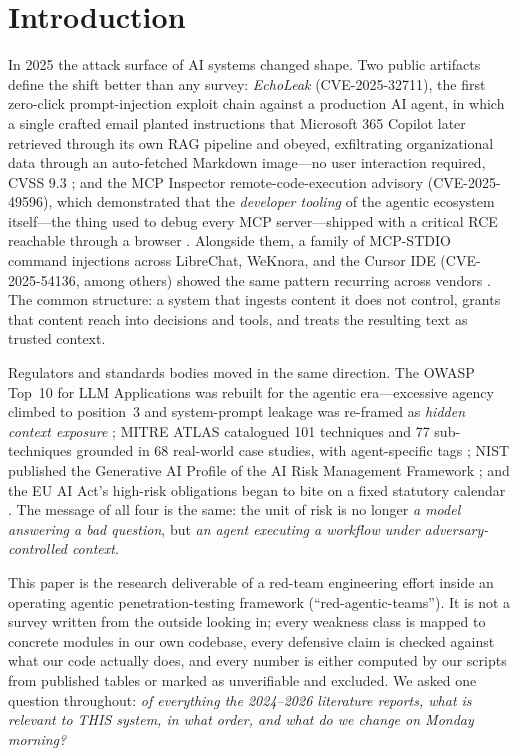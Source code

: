 \section{Introduction}\label{sec:intro}

In 2025 the attack surface of AI systems changed shape. Two public artifacts define
the shift better than any survey: \emph{EchoLeak} (CVE-2025-32711), the first
zero-click prompt-injection exploit chain against a production AI agent, in which a
single crafted email planted instructions that Microsoft 365 Copilot later retrieved
through its own RAG pipeline and obeyed, exfiltrating organizational data through an
auto-fetched Markdown image---no user interaction required, CVSS 9.3
\cite{echolake-cve,echolake-paper}; and the MCP Inspector remote-code-execution
advisory (CVE-2025-49596), which demonstrated that the \emph{developer tooling} of
the agentic ecosystem itself---the thing used to debug every MCP server---shipped
with a critical RCE reachable through a browser
\cite{cve-2025-49596,oligo-mcp}. Alongside them, a family of MCP-STDIO command
injections across LibreChat, WeKnora, and the Cursor IDE
(CVE-2025-54136, among others) showed the same pattern recurring across vendors
\cite{ox-mcp-family}. The common structure: a system that ingests content it does
not control, grants that content reach into decisions and tools, and treats the
resulting text as trusted context.

Regulators and standards bodies moved in the same direction. The OWASP Top~10 for
LLM Applications was rebuilt for the agentic era---excessive agency climbed to
position~3 and system-prompt leakage was re-framed as \emph{hidden context exposure}
\cite{owasp2026,owasp2025}; MITRE ATLAS catalogued 101 techniques and 77
sub-techniques grounded in 68 real-world case studies, with agent-specific
tags \cite{atlas}; NIST published the Generative
AI Profile of the AI Risk Management Framework \cite{nist-ai-rmf,nist-genai}; and
the EU AI Act's high-risk obligations began to bite on a fixed statutory calendar
\cite{eu-ai-act}. The message of all four is the same: the unit of risk is no longer
\emph{a model answering a bad question}, but \emph{an agent executing a workflow
under adversary-controlled context}.

This paper is the research deliverable of a red-team engineering effort inside an
operating agentic penetration-testing framework (``red-agentic-teams''). It is not
a survey written from the outside looking in; every weakness class is mapped to
concrete modules in our own codebase, every defensive claim is checked against what
our code actually does, and every number is either computed by our scripts from
published tables or marked as unverifiable and excluded. We asked one question
throughout: \emph{of everything the 2024--2026 literature reports, what is relevant
to THIS system, in what order, and what do we change on Monday morning?}

